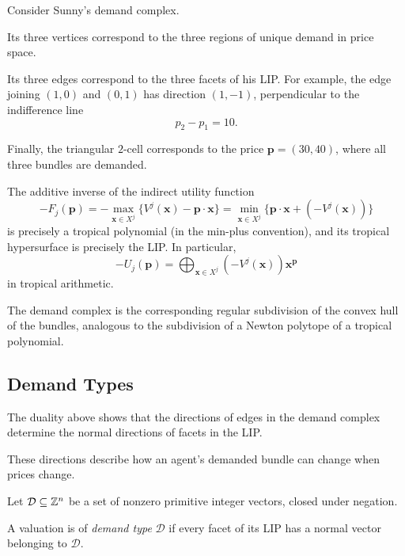 \documentclass[../../main.tex]{subfiles}
\begin{document}
\begin{example}
    Consider Sunny's demand complex.

    Its three vertices correspond to the three regions of
    unique demand in price space.

    Its three edges correspond to the three facets of his LIP.
    For example, the edge joining $(1,0)$ and $(0,1)$ has
    direction $(1,-1)$, perpendicular to the indifference
    line
    \[
        p_2-p_1=10.
    \]

    Finally, the triangular $2$-cell corresponds to the
    price $\mathbf{p}=(30,40)$, where all three bundles are demanded.

\end{example}

\begin{rmk}
    The additive inverse of the indirect utility function
    \[
        -F_j(\mathbf{p})=-\max_{\mathbf{x}\in X^j}\{V^j(\mathbf{x})-\mathbf{p}\cdot \mathbf{x}\}=\min_{\mathbf{x} \in X^j}\{\mathbf{p}\cdot \mathbf{x}+(-V^j(\mathbf{x}))\}
    \]
    is precisely a tropical polynomial (in the min-plus convention),
    and its tropical hypersurface is precisely the LIP. In particular,
    \[
        -U_j(\mathbf{p})=\bigoplus_{\mathbf{x} \in X^j}(-V^j(\mathbf{x}))\mathbf{x}^{\mathbf{p}}
    \]
    in tropical arithmetic. 
    
    The demand complex is the corresponding regular subdivision
    of the convex hull of the bundles, analogous to the
    subdivision of a Newton polytope of a tropical polynomial.
\end{rmk}



\subsection{Demand Types}

The duality above shows that the directions of edges in
the demand complex determine the normal directions of
facets in the LIP.

These directions describe how an agent's demanded bundle
can change when prices change.

\begin{defin}
    Let $\mathcal D\subseteq\mathbb{Z}^n$ be a set of nonzero
    primitive integer vectors, closed under negation.

    A valuation is of \textit{demand type} $\mathcal D$
    if every facet of its LIP has a normal vector
    belonging to $\mathcal D$.
\end{defin}
\end{document}
